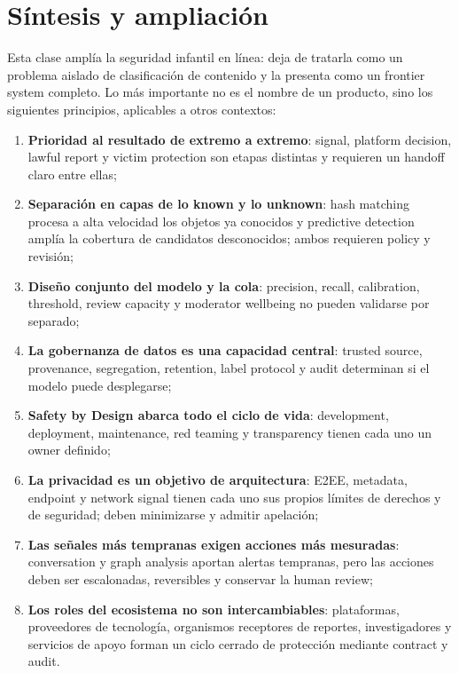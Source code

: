 \section{Síntesis y ampliación}

Esta clase amplía la seguridad infantil en línea: deja de tratarla como un problema aislado de clasificación de contenido y la presenta como un frontier system completo. Lo más importante no es el nombre de un producto, sino los siguientes principios, aplicables a otros contextos:

\begin{enumerate}
  \item \textbf{Prioridad al resultado de extremo a extremo}: signal, platform decision, lawful report y victim protection son etapas distintas y requieren un handoff claro entre ellas;
  \item \textbf{Separación en capas de lo known y lo unknown}: hash matching procesa a alta velocidad los objetos ya conocidos y predictive detection amplía la cobertura de candidatos desconocidos; ambos requieren policy y revisión;
  \item \textbf{Diseño conjunto del modelo y la cola}: precision, recall, calibration, threshold, review capacity y moderator wellbeing no pueden validarse por separado;
  \item \textbf{La gobernanza de datos es una capacidad central}: trusted source, provenance, segregation, retention, label protocol y audit determinan si el modelo puede desplegarse;
  \item \textbf{Safety by Design abarca todo el ciclo de vida}: development, deployment, maintenance, red teaming y transparency tienen cada uno un owner definido;
  \item \textbf{La privacidad es un objetivo de arquitectura}: E2EE, metadata, endpoint y network signal tienen cada uno sus propios límites de derechos y de seguridad; deben minimizarse y admitir apelación;
  \item \textbf{Las señales más tempranas exigen acciones más mesuradas}: conversation y graph analysis aportan alertas tempranas, pero las acciones deben ser escalonadas, reversibles y conservar la human review;
  \item \textbf{Los roles del ecosistema no son intercambiables}: plataformas, proveedores de tecnología, organismos receptores de reportes, investigadores y servicios de apoyo forman un ciclo cerrado de protección mediante contract y audit.
\end{enumerate}

